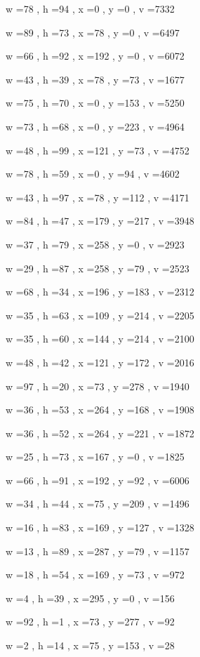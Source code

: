 \documentclass[11pt]{article}
\begin{document}
w =78 , h =94 , x =0 , y =0 , v =7332
\par
w =89 , h =73 , x =78 , y =0 , v =6497
\par
w =66 , h =92 , x =192 , y =0 , v =6072
\par
w =43 , h =39 , x =78 , y =73 , v =1677
\par
w =75 , h =70 , x =0 , y =153 , v =5250
\par
w =73 , h =68 , x =0 , y =223 , v =4964
\par
w =48 , h =99 , x =121 , y =73 , v =4752
\par
w =78 , h =59 , x =0 , y =94 , v =4602
\par
w =43 , h =97 , x =78 , y =112 , v =4171
\par
w =84 , h =47 , x =179 , y =217 , v =3948
\par
w =37 , h =79 , x =258 , y =0 , v =2923
\par
w =29 , h =87 , x =258 , y =79 , v =2523
\par
w =68 , h =34 , x =196 , y =183 , v =2312
\par
w =35 , h =63 , x =109 , y =214 , v =2205
\par
w =35 , h =60 , x =144 , y =214 , v =2100
\par
w =48 , h =42 , x =121 , y =172 , v =2016
\par
w =97 , h =20 , x =73 , y =278 , v =1940
\par
w =36 , h =53 , x =264 , y =168 , v =1908
\par
w =36 , h =52 , x =264 , y =221 , v =1872
\par
w =25 , h =73 , x =167 , y =0 , v =1825
\par
w =66 , h =91 , x =192 , y =92 , v =6006
\par
w =34 , h =44 , x =75 , y =209 , v =1496
\par
w =16 , h =83 , x =169 , y =127 , v =1328
\par
w =13 , h =89 , x =287 , y =79 , v =1157
\par
w =18 , h =54 , x =169 , y =73 , v =972
\par
w =4 , h =39 , x =295 , y =0 , v =156
\par
w =92 , h =1 , x =73 , y =277 , v =92
\par
w =2 , h =14 , x =75 , y =153 , v =28
\par
\newpage
\end{document}
